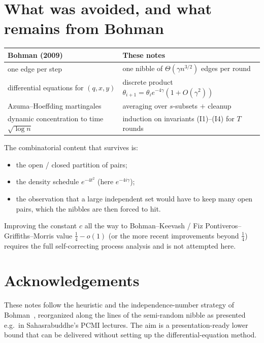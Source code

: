 \documentclass[11pt]{article}
\theoremstyle{definition}
\begin{document}
\section{What was avoided, and what remains from Bohman}

\begin{center}
\begin{tabular}{ll}
\hline
Bohman (2009) & These notes \\
\hline
one edge per step & one nibble of $\Theta(\gamma n^{3/2})$ edges per round \\
differential equations for $(q,x,y)$ & discrete product $\theta_{i+1}=\theta_i e^{-4\gamma}(1+O(\gamma^{2}))$ \\
Azuma--Hoeffding martingales & averaging over $s$-subsets $+$ cleanup \\
dynamic concentration to time $\sqrt{\log n}$ & induction on invariants (I1)--(I4) for $T$ rounds \\
\hline
\end{tabular}
\end{center}

The combinatorial content that survives is:
\begin{itemize}
  \item the open / closed partition of pairs;
  \item the density schedule $e^{-4t^{2}}$ (here $e^{-4i\gamma}$);
  \item the observation that a large independent set would have to keep many open pairs, which the nibbles are then forced to hit.
\end{itemize}

Improving the constant $c$ all the way to Bohman--Keevash / Fiz Pontiveros--Griffiths--Morris value $\tfrac14-o(1)$ (or the more recent improvements beyond $\tfrac14$) requires the full self-correcting process analysis and is not attempted here.

\section*{Acknowledgements}

These notes follow the heuristic and the independence-number strategy of Bohman~\cite{Bohman2009}, reorganized along the lines of the semi-random nibble as presented e.g.\ in Sahasrabuddhe's PCMI lectures.
The aim is a presentation-ready lower bound that can be delivered without setting up the differential-equation method.
\end{document}
